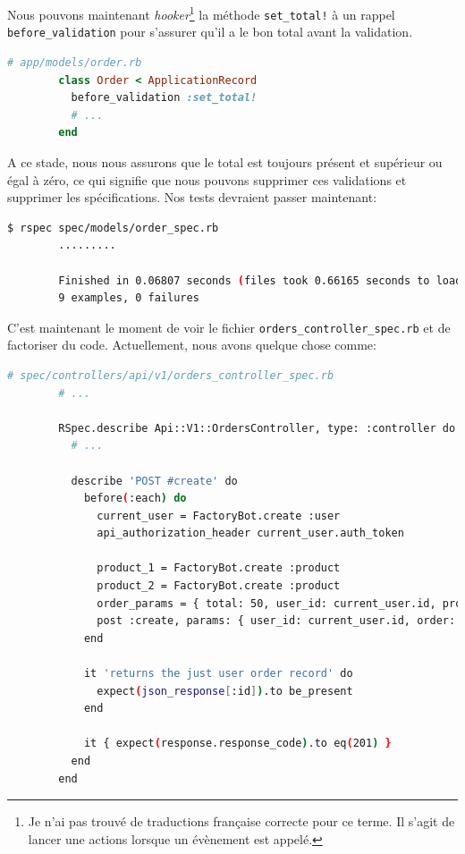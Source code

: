 \documentclass[]{report}
\begin{document}
      Nous pouvons maintenant \textit{hooker}\footnote{Je n'ai pas trouvé de traductions française correcte pour ce terme. Il s'agit de lancer une actions lorsque un évènement est appelé.} la méthode \verb|set_total!| à un rappel \verb|before_validation| pour s'assurer qu'il a le bon total avant la validation.

      \begin{scriptsize}
        \begin{lstlisting}[language=ruby]
        # app/models/order.rb
        class Order < ApplicationRecord
          before_validation :set_total!
          # ...
        end
        \end{lstlisting}
      \end{scriptsize}

      A ce stade, nous nous assurons que le total est toujours présent et supérieur ou égal à zéro, ce qui signifie que nous pouvons supprimer ces validations et supprimer les spécifications. Nos tests devraient passer maintenant:

      \begin{scriptsize}
        \begin{lstlisting}[language=bash]
        $ rspec spec/models/order_spec.rb
        .........

        Finished in 0.06807 seconds (files took 0.66165 seconds to load)
        9 examples, 0 failures
        \end{lstlisting}
      \end{scriptsize}

      C'est maintenant le moment de voir le fichier \verb|orders_controller_spec.rb| et de factoriser du code. Actuellement, nous avons quelque chose comme:

      \begin{scriptsize}
        \begin{lstlisting}[language=bash]
        # spec/controllers/api/v1/orders_controller_spec.rb
        # ...

        RSpec.describe Api::V1::OrdersController, type: :controller do
          # ...

          describe 'POST #create' do
            before(:each) do
              current_user = FactoryBot.create :user
              api_authorization_header current_user.auth_token

              product_1 = FactoryBot.create :product
              product_2 = FactoryBot.create :product
              order_params = { total: 50, user_id: current_user.id, product_ids: [product_1.id, product_2.id] }
              post :create, params: { user_id: current_user.id, order: order_params }
            end

            it 'returns the just user order record' do
              expect(json_response[:id]).to be_present
            end

            it { expect(response.response_code).to eq(201) }
          end
        end
        \end{lstlisting}
      \end{scriptsize}
\end{document}
